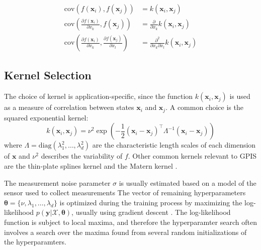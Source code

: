 \documentclass[letterpaper, 10 pt, conference]{ieeeconf}  %
\newcommand{\by}{\mathbf{y}}
\newcommand{\bx}{\mathbf{x}}
\newcommand{\mX}{\mathcal{X}}
\begin{document}
\begin{align*}
	\text{cov}\left(f(\bx_i), f(\bx_j) \right) &=  k(\bx_i, \bx_j) \\
	\text{cov}\left(\frac{\partial f (\bx_i)}{\partial x_k}, f(\bx_j) \right) &= \frac{\partial}{\partial x_k} k(\bx_i, \bx_j) \\
	\text{cov}\left(\frac{\partial f (\bx_i)}{\partial x_k}, \frac{\partial f (\bx_j)}{\partial x_l} \right) &= \frac{\partial^2}{\partial x_k \partial x_l} k(\bx_i, \bx_j)
\end{align*}

\subsection{Kernel Selection}
The choice of kernel is application-specific, since the function $k(\bx_i,\bx_j)$ is used as a measure of correlation between states $\bx_i$ and $\bx_j$. A common choice is the squared exponential kernel:
\begin{equation}
	k(\bx_i,\bx_j) = \nu^2\exp(-\frac{1}{2}(\bx_i - \bx_j)^{\intercal}\Lambda^{-1}(\bx_i - \bx_j))
\end{equation}
where $\Lambda= \text{diag}(\lambda_1^2,\ldots,\lambda_d^2)$ are the characteristic length scales of each dimension of $\bx$ and $\nu^2$ describes the variability of $f$.
Other common kernels relevant to GPIS are the thin-plate splines kernel \cite{williams2007} and the Matern kernel \cite{bjorkman2013enhancing}.

The measurement noise parameter $\sigma$ is usually estimated based on a model of the sensor used to collect measurements
The vector of remaining hyperparameters $\boldsymbol{\theta} = \{\nu, \lambda_1,\ldots,\lambda_d\}$ is optimized during the training process by maximizing the log-likelihood $p(\by|\mX,\boldsymbol{\theta})$, usually using gradient descent \cite{rasmussen2010gaussian}.
The log-likelihood function is subject to local maxima, and therefore the hyperparamter search often involves a search over the maxima found from several random initializations of the hyperparamters.
\end{document}

